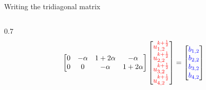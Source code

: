 \documentclass{beamer}
\begin{document}
\begin{frame}{Writing the tridiagonal matrix}
\begin{columns}
\begin{column}{0.7\textwidth}
{\begin{align*}
\begin{bmatrix}
                        0 & -\alpha & 1 + 2\alpha & -\alpha  \\
                         0 & 0 & -\alpha & 1 + 2\alpha  \\
                    \end{bmatrix}
                    \begin{bmatrix}
                        \textcolor{red}{u_{1,2}^{k+\frac{1}{2}}} \\
                        \textcolor{red}{u_{2,2}^{k+\frac{1}{2}}} \\
                        \textcolor{red}{u_{3,2}^{k+\frac{1}{2}}} \\
                        \textcolor{red}{u_{4,2}^{k+\frac{1}{2}}} \\
                    \end{bmatrix}
                    =
                    \begin{bmatrix}
                        \textcolor{blue}{b_{1,2}} \\
                        \textcolor{blue}{b_{2,2}} \\
                        \textcolor{blue}{b_{3,2}} \\
                        \textcolor{blue}{b_{4,2}} \\
                    \end{bmatrix}
                \end{align*}
                }
                \vspace{-0.5cm}
\end{column}
\end{columns}
\end{frame}
\end{document}
